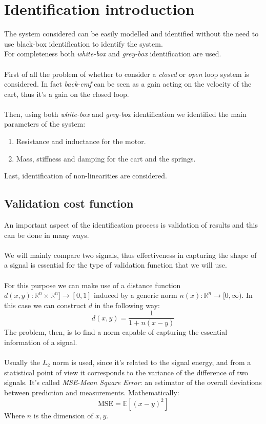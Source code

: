 \chapter{Identification introduction}
The system considered can be easily modelled and identified without the need to use black-box identification to identify the system. \\ For completeness both \emph{white-box} and \emph{grey-box} identification are used.\\ \\
First of all the problem of whether to consider a \emph{closed} or \emph{open} loop system is considered. In fact \emph{back-emf} can be seen as a gain acting on the velocity of the cart, thus it's a gain on the closed loop.\\ \\
Then, using both \emph{white-box} and \emph{grey-box} identification we identified the main parameters of the system: 
\begin{enumerate}
\item Resistance and inductance for the motor.
\item Mass, stiffness and damping for the cart and the springs.
\end{enumerate}
Last, identification of non-linearities are considered.
\section{Validation cost function}
\label{sec:validation_cost_function}
An important aspect of the identification process is validation of results and this can be done in many ways. \\ \\
We will mainly compare two signals, thus effectiveness in capturing the shape of  a signal is essential for the type of validation function that we will use. \\  \\
For this purpose we can make use of a distance function $d(x,y): \mathbb{R}^n \times \mathbb{R}^n]\to [0,1]$ induced by a generic norm $n(x) : \mathbb{R}^n \to [0,\infty)$. In this case we can construct $d$ in the following way:
$$d(x,y) = \frac{1}{1+n(x-y)}$$
 The problem, then, is to find a norm capable of capturing the essential information of a signal. \\ \\Usually the $L_2$ norm is used, since it's related to the signal energy, and from a statistical point of view it corresponds to the variance of the difference of two signals. It's called \emph{MSE}-\emph{Mean Square Error}: an estimator of the overall deviations between prediction and measurements. Mathematically:
$$\text{MSE} =  \mathbb{E}[(x-y)^2]$$
Where $n$ is the dimension of $x,y$.

